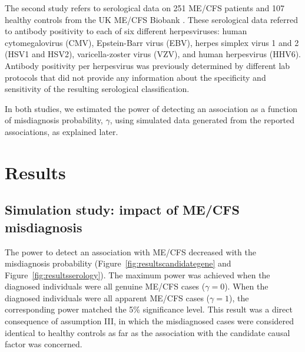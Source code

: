 The second study refers to serological data on 251 ME/CFS patients and 107 healthy controls from the UK ME/CFS Biobank \citep{cliff2019CellularImmune}. These serological data referred to antibody positivity to each of six different herpesviruses: human cytomegalovirus (CMV), Epstein-Barr virus (EBV), herpes simplex virus 1 and 2 (HSV1 and HSV2), varicella-zoster virus (VZV), and human herpesvirus (HHV6). Antibody positivity per herpesvirus was previously determined by different lab protocols that did not provide any information about the specificity and sensitivity of the resulting serological classification.

In both studies, we estimated the power of detecting an association as a function of misdiagnosis probability, $\gamma$, using simulated data generated from the reported associations, as explained later.

\section{Results}

\subsection{Simulation study: impact of ME/CFS misdiagnosis}

The power to detect an association with ME/CFS decreased with the misdiagnosis probability (Figure~\ref{fig:resultscandidategene} and Figure~\ref{fig:resultsserology}). The maximum power was achieved when the diagnosed individuals were all genuine ME/CFS cases ($\gamma = 0$). When the diagnosed individuals were all apparent ME/CFS cases ($\gamma = 1$), the corresponding power matched the 5\% significance level. This result was a direct consequence of assumption III, in which the misdiagnosed cases were considered identical to healthy controls as far as the association with the candidate causal factor was concerned.

